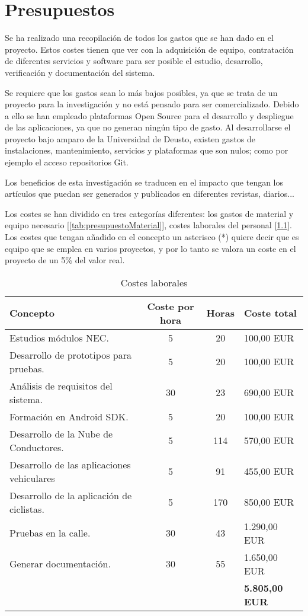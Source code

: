 \chapter{Presupuestos}
Se ha realizado una recopilación de todos los gastos que se han dado en el proyecto. Estos costes tienen que ver con la adquisición de equipo, contratación de diferentes servicios y software para ser posible el estudio, desarrollo, verificación y documentación del sistema.

Se requiere que los gastos sean lo más bajos posibles, ya que se trata de un proyecto para la investigación y no está pensado para ser comercializado. Debido a ello se han empleado plataformas Open Source para el desarrollo y despliegue de las aplicaciones, ya que no generan ningún tipo de gasto. Al desarrollarse el proyecto bajo amparo de la Universidad de Deusto, existen gastos de
instalaciones, mantenimiento, servicios y plataformas que son nulos; como por ejemplo el acceso repositorios Git.

Los beneficios de esta investigación se traducen en el impacto que tengan los artículos que puedan ser generados y publicados en diferentes revistas, diarios...

Los costes se han dividido en tres categorías diferentes: los gastos de material y equipo necesario [\ref{tab:presupuestoMaterial}], costes laborales del personal [\ref{tab:presupuestoLaboral}]. Los costes que tengan añadido en el concepto un asterisco (*) quiere decir que es equipo que se emplea en varios proyectos, y por lo tanto se valora un coste en el proyecto de un 5\% del valor real.

\begin{table}[h]
	\centering
	\caption{Costes laborales}\label{tab:presupuestoLaboral}
	\begin{tabular}{lccl}
		\toprule
		\textbf{Concepto} & \textbf{Coste por hora} & \textbf{Horas} & \textbf{Coste total} \\
		\midrule
		Estudios módulos NEC. & 5 & 20 & 100,00 EUR \\
		Desarrollo de prototipos para pruebas. & 5 & 20 & 100,00 EUR \\
		Análisis de requisitos del sistema. & 30 & 23 & 690,00 EUR \\
		Formación en Android SDK. & 5 & 20 & 100,00 EUR \\
		Desarrollo de la Nube de Conductores. & 5 & 114 & 570,00 EUR \\
		Desarrollo de las aplicaciones vehiculares  & 5 & 91 & 455,00 EUR \\
		Desarrollo de la aplicación de ciclistas. & 5 & 170 & 850,00 EUR \\
		Pruebas en la calle. & 30 & 43 & 1.290,00 EUR \\
		Generar documentación. & 30 & 55 & 1.650,00 EUR \\
		& & & \textbf{5.805,00 EUR} \\
		\bottomrule
	\end{tabular}
\end{table}

